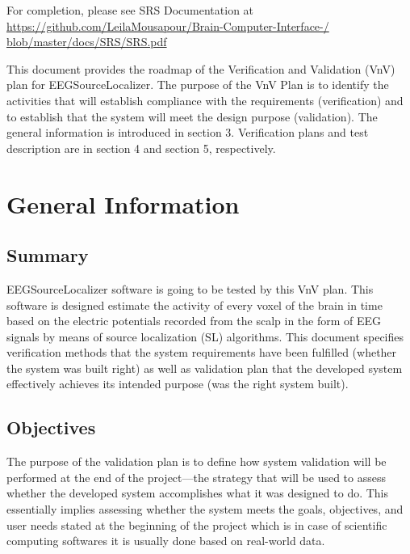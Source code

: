 \documentclass[12pt, titlepage]{article}
\renewcommand{\progname}{EEGSourceLocalizer}
\begin{document}
For completion, please see SRS Documentation at \url{https://github.com/LeilaMousapour/Brain-Computer-Interface-/ blob/master/docs/SRS/SRS.pdf}


\newpage


This document provides the roadmap of the Verification and Validation (VnV) plan for \progname{}. The purpose of the VnV Plan is to identify the activities that will establish compliance with the requirements (verification) and to establish that the system will meet the design purpose (validation). The general information is introduced in section 3.  Verification plans and test description are in section 4 and section 5, respectively. 


\section{General Information}

\subsection{Summary}


\progname{} software is going to be tested by this VnV plan. This software is designed estimate the activity of every voxel of the brain in time based on the electric potentials recorded from the scalp in the form of EEG signals by means of source localization (SL) algorithms. This document specifies verification methods  that the system requirements have been fulfilled (whether the system was built right) as well as validation plan that the developed system effectively achieves its intended purpose (was the right system built). 

\subsection{Objectives}

The purpose of the validation plan is to define how system validation will be performed at the end of the project—the strategy that will be used to assess whether the developed system accomplishes what it was designed to do. This essentially implies assessing whether the system meets the goals, objectives, and user needs stated at the beginning of the project which is in case of scientific computing softwares it is usually done based on real-world data. \\ 
\end{document}
